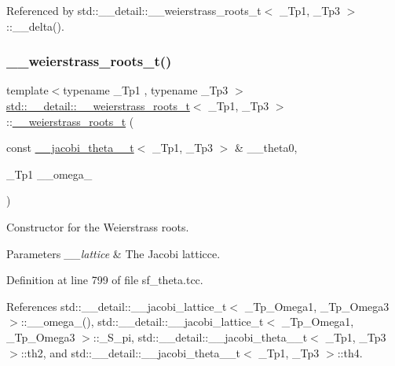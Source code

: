 Referenced by std\+::\+\_\+\+\_\+detail\+::\+\_\+\+\_\+weierstrass\+\_\+roots\+\_\+t$<$ \+\_\+\+Tp1, \+\_\+\+Tp3 $>$\+::\+\_\+\+\_\+delta().

\mbox{\label{structstd_1_1____detail_1_1____weierstrass__roots__t_a032b7fead8c0379bcaf4594f40b78c28}} 
\subsubsection{\texorpdfstring{\+\_\+\+\_\+weierstrass\+\_\+roots\+\_\+t()}{\_\_weierstrass\_roots\_t()}\hspace{0.1cm}{\footnotesize\ttfamily [2/2]}}
{\footnotesize\ttfamily template$<$typename \+\_\+\+Tp1 , typename \+\_\+\+Tp3 $>$ \\
\hyperlink{structstd_1_1____detail_1_1____weierstrass__roots__t}{std\+::\+\_\+\+\_\+detail\+::\+\_\+\+\_\+weierstrass\+\_\+roots\+\_\+t}$<$ \+\_\+\+Tp1, \+\_\+\+Tp3 $>$\+::\hyperlink{structstd_1_1____detail_1_1____weierstrass__roots__t}{\+\_\+\+\_\+weierstrass\+\_\+roots\+\_\+t} (\begin{DoxyParamCaption}\item[{const \hyperlink{structstd_1_1____detail_1_1____jacobi__theta__0__t}{\+\_\+\+\_\+jacobi\+\_\+theta\+\_\+0\+\_\+t}$<$ \+\_\+\+Tp1, \+\_\+\+Tp3 $>$ \&}]{\+\_\+\+\_\+theta0,  }\item[{\+\_\+\+Tp1}]{\+\_\+\+\_\+omega\+\_ }\end{DoxyParamCaption})}

Constructor for the Weierstrass roots.


\begin{DoxyParams}{Parameters}
{\em \+\_\+\+\_\+lattice} & The Jacobi latticce. \\
\hline
\end{DoxyParams}


Definition at line 799 of file sf\+\_\+theta.\+tcc.



References std\+::\+\_\+\+\_\+detail\+::\+\_\+\+\_\+jacobi\+\_\+lattice\+\_\+t$<$ \+\_\+\+Tp\+\_\+\+Omega1, \+\_\+\+Tp\+\_\+\+Omega3 $>$\+::\+\_\+\+\_\+omega\+\_(), std\+::\+\_\+\+\_\+detail\+::\+\_\+\+\_\+jacobi\+\_\+lattice\+\_\+t$<$ \+\_\+\+Tp\+\_\+\+Omega1, \+\_\+\+Tp\+\_\+\+Omega3 $>$\+::\+\_\+\+S\+\_\+pi, std\+::\+\_\+\+\_\+detail\+::\+\_\+\+\_\+jacobi\+\_\+theta\+\_\+\_\+t$<$ \+\_\+\+Tp1, \+\_\+\+Tp3 $>$\+::th2, and std\+::\+\_\+\+\_\+detail\+::\+\_\+\+\_\+jacobi\+\_\+theta\+\_\+\_\+t$<$ \+\_\+\+Tp1, \+\_\+\+Tp3 $>$\+::th4.



